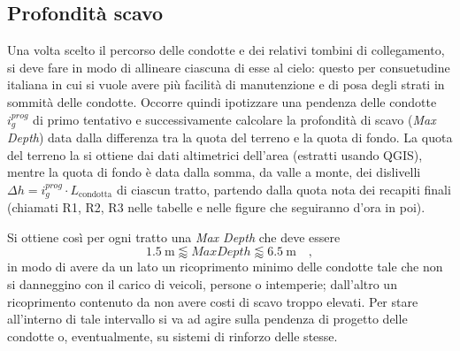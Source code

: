 \subsection{Profondità scavo}
Una volta scelto il percorso delle condotte e dei relativi tombini di collegamento, si deve fare in modo di allineare ciascuna di esse al cielo: 
questo per consuetudine italiana in cui si vuole avere più facilità di manutenzione e di posa degli strati in sommità delle condotte. 
Occorre quindi ipotizzare una pendenza delle condotte $i_g^{prog}$ di primo tentativo e successivamente calcolare la profondità di scavo (\emph{Max Depth}) data dalla differenza tra la quota del terreno e la quota di fondo.
La quota del terreno la si ottiene dai dati altimetrici dell'area (estratti usando QGIS), mentre la quota di fondo è data dalla somma, da valle a monte, dei dislivelli $\Delta h = i_g^{prog} \cdot L_{\text{condotta}}$ di ciascun tratto, partendo dalla quota nota dei recapiti finali (chiamati R1, R2, R3 nelle tabelle e nelle figure che seguiranno d'ora in poi).

Si ottiene così per ogni tratto una \emph{Max Depth} che deve essere
\begin{equation}
    \SI{1.5}{\metre} \lessapprox Max Depth \lessapprox\SI{6.5}{\metre}\quad ,
\end{equation} 
in modo di avere da un lato un ricoprimento minimo delle condotte tale che non si danneggino con il carico di veicoli, persone o intemperie;  dall'altro un ricoprimento contenuto da non avere costi di scavo troppo elevati. 
Per stare all'interno di tale intervallo si va ad agire sulla pendenza di progetto delle condotte o, eventualmente, su sistemi di rinforzo delle stesse.
